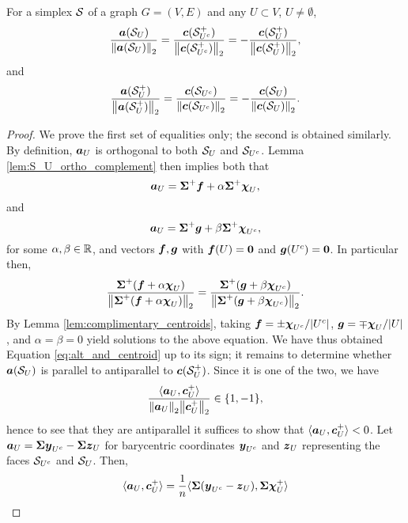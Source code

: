 \begin{lemma}
\label{lem:alt_and_centroid}
For a simplex $\mathcal{S}$ of a graph $G=(V,E)$ and any $U\subset V$, $U\neq\emptyset$, 
\begin{equation}
\label{eq:alt_and_centroid}
    \frac{\vb*{a}(\mathcal{S}_U)}{\norm{\vb*{a}(\mathcal{S}_{U})}_2}=\frac{\vb*{c}(\mathcal{S}^+_{U^c})}{\norm{\vb*{c}(\mathcal{S}^+_{U^c})}_2}=-\frac{\vb*{c}(\mathcal{S}^+_{U})}{\norm{\vb*{c}(\mathcal{S}^+_{U})}_2},
\end{equation}
and 
\begin{equation*}
    \frac{\vb*{a}(\mathcal{S}^+_U)}{\norm{\vb*{a}(\mathcal{S}^+_{U})}_2}=\frac{\vb*{c}(\mathcal{S}_{U^c})}{\norm{\vb*{c}(\mathcal{S}_{U^c})}_2}=-\frac{\vb*{c}(\mathcal{S}_{U})}{\norm{\vb*{c}(\mathcal{S}_{U})}_2}.
\end{equation*}
\end{lemma}
\begin{proof}
We prove the first set of equalities only; the second is obtained similarly. By definition, $\vb*{a}_U$ is orthogonal to both $\mathcal{S}_U$ and $\mathcal{S}_{U^c}$. Lemma \ref{lem:S_U_ortho_complement} then implies both that 
\begin{equation*}
\vb*{a}_U = \boldsymbol{\Sigma}^+\vb*{f} + \alpha \boldsymbol{\Sigma}^+\boldsymbol{\chi}_U,
\end{equation*}
and 
\begin{equation*}
\vb*{a}_U = \boldsymbol{\Sigma}^+\vb*{g} + \beta\boldsymbol{\Sigma}^+\boldsymbol{\chi}_{U^c},
\end{equation*}
for some $\alpha,\beta\in\mathbb{R}$, and vectors $\vb*{f},\vb*{g}$ with $\vb*{f}(U)=\vb{0}$ and $\vb*{g}(U^c)=\vb{0}$. In particular then, 
\begin{equation}
\label{eq:lem_alt_centroid1}
\frac{\boldsymbol{\Sigma}^+(\vb*{f}+\alpha\boldsymbol{\chi}_U)}{\norm{\boldsymbol{\Sigma}^+(\vb*{f}+\alpha\boldsymbol{\chi}_U)}_2}=\frac{\boldsymbol{\Sigma}^+(\vb*{g}+\beta\boldsymbol{\chi}_{U^c})}{\norm{\boldsymbol{\Sigma}^+(\vb*{g}+\beta\boldsymbol{\chi}_{U^c})}_2}.
\end{equation}
By Lemma \ref{lem:complimentary_centroids}, taking $\vb*{f}=\pm\boldsymbol{\chi}_{U^c}/|U^c|$, $\vb*{g}=\mp\boldsymbol{\chi}_U/|U|$, and $\alpha=\beta=0$ yield solutions to the above equation. We have thus obtained Equation \eqref{eq:alt_and_centroid} up to its sign; 
it remains to determine whether $\vb*{a}(\mathcal{S}_U)$ is parallel to antiparallel to $\vb*{c}(\mathcal{S}^+_U)$. Since it is one of the two, we have 
\[\frac{\langle \vb*{a}_U,\vb*{c}^+_U\rangle}{\norm{\vb*{a}_U}_2\norm{\vb*{c}^+_U}_2}\in\{1,-1\},\]
hence to see that they are antiparallel it suffices to show that $\langle \vb*{a}_U,\vb*{c}^+_U\rangle<0$. Let $\vb*{a}_U= \boldsymbol{\Sigma}\vb*{y}_{U^c}-\boldsymbol{\Sigma}\vb*{z}_U$ for barycentric coordinates $\vb*{y}_{U^c}$ and $\vb*{z}_U$ representing the faces $\mathcal{S}_{U^c}$ and $\mathcal{S}_U$. Then, 
\begin{align*}
\la \alt_U,\cent^+_U\ra &= \frac{1}{n}\la \Sv(\y_{U^c}-\z_U),\Sv\bchi^+_U\ra \\

\end{align*}
\end{proof}
